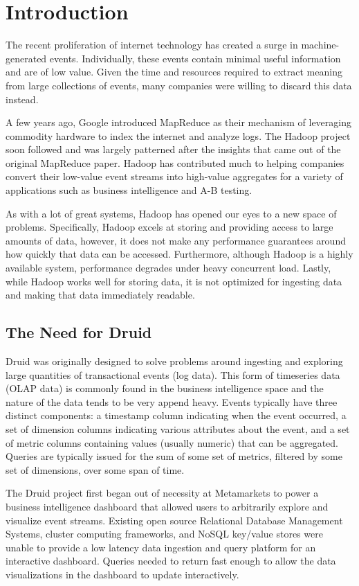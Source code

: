 \documentclass{vldb}
\begin{document}
\section{Introduction}
The recent proliferation of internet technology has created a surge
in machine-generated events.  Individually, these events contain minimal useful
information and are of low value.  Given the time and resources required to
extract meaning from large collections of events, many companies were willing
to discard this data instead.  

A few years ago, Google introduced MapReduce as their mechanism of leveraging
commodity hardware to index the internet and analyze logs.  The Hadoop project
soon followed and was largely patterned after the insights that came out of the
original MapReduce paper. Hadoop has contributed much to helping companies
convert their low-value event streams into high-value aggregates for a variety
of applications such as business intelligence and A-B testing.

As with a lot of great systems, Hadoop has opened our eyes to a new space of
problems.  Specifically, Hadoop excels at storing and providing access to large
amounts of data, however, it does not make any performance guarantees around
how quickly that data can be accessed.  Furthermore, although Hadoop is a
highly available system, performance degrades under heavy concurrent load.
Lastly, while Hadoop works well for storing data, it is not optimized for
ingesting data and making that data immediately readable.

\subsection{The Need for Druid}
Druid was originally designed to solve problems around ingesting and exploring
large quantities of transactional events (log data). This form of timeseries
data (OLAP data) is commonly found in the business intelligence
space and the nature of the data tends to be very append heavy. Events typically
have three distinct components: a timestamp column indicating when the event
occurred, a set of dimension columns indicating various attributes about the
event, and a set of metric columns containing values (usually numeric) that can
be aggregated. Queries are typically issued for the sum of some set of metrics,
filtered by some set of dimensions, over some span of time. 

The Druid project first began out of necessity at Metamarkets to power a
business intelligence dashboard that allowed users to arbitrarily explore and
visualize event streams. Existing open source Relational Database Management
Systems, cluster computing frameworks, and NoSQL key/value stores were unable
to provide a low latency data ingestion and query platform for an interactive
dashboard. Queries needed to return fast enough to allow the data
visualizations in the dashboard to update interactively.
\end{document}
